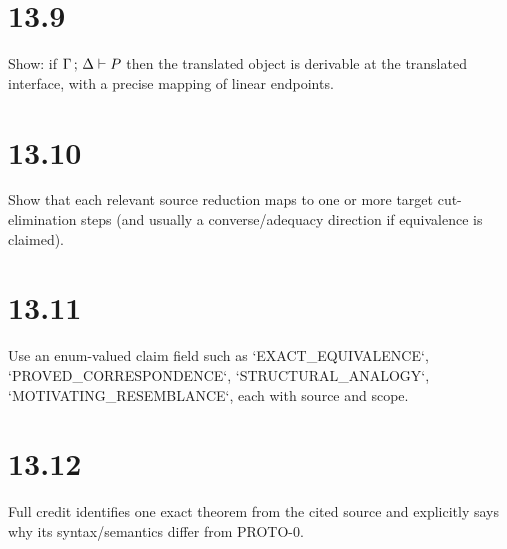\section*{13.9}
Show: if $\Gamma\,;\,\Delta \vdash P$ then the translated object is derivable at the translated interface, with a precise mapping of linear endpoints.

\section*{13.10}
Show that each relevant source reduction maps to one or more target cut-elimination steps (and usually a converse/adequacy direction if equivalence is claimed).

\section*{13.11}
Use an enum-valued claim field such as `EXACT_EQUIVALENCE`, `PROVED_CORRESPONDENCE`, `STRUCTURAL_ANALOGY`, `MOTIVATING_RESEMBLANCE`, each with source and scope.

\section*{13.12}
Full credit identifies one exact theorem from the cited source and explicitly says why its syntax/semantics differ from PROTO-0.
